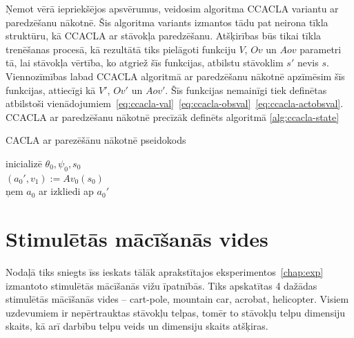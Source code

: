 \documentclass{ludis} %
\begin{document}
Ņemot vērā iepriekšējos apsvērumus, veidosim algoritma CCACLA variantu ar
paredzēšanu nākotnē. Šis algoritma variants izmantos tādu pat neirona tīkla
struktūru, kā CCACLA ar stāvokļa paredzēšanu. Atšķirības būs tikai tīkla
trenēšanas procesā, kā rezultātā tiks pielāgoti funkciju $V$, $Ov$ un $Aov$
parametri tā, lai stāvokļa vērtība, ko atgriež šīs funkcijas, atbilstu stāvoklim
$s'$ nevis $s$. Viennozīmības labad CCACLA algoritmā ar paredzēšanu nākotnē
apzīmēsim šīs funkcijas, attiecīgi kā $V'$, $Ov'$ un $Aov'$. Šīs funkcijas
nemainīgi tiek definētas atbilstoši
vienādojumiem~\eqref{eq:ccacla-val}~\eqref{eq:ccacla-obsval}~\eqref{eq:ccacla-actobsval}.
CCACLA ar paredzēšanu nākotnē precīzāk definēts algoritmā \ref{alg:ccacla-state}


\begin{spacing}{1}
\begin{algorithm}
\caption{CACLA ar parezēšānu nākotnē pseidokods}\label{alg:ccacla-future}
inicializē $\theta_0, \psi_0, s_0$ \\
$(a_0', v_1) := Av_0(s_0)$ \\
ņem $a_0$ ar izkliedi ap $a_0'$ \\
\end{algorithm}
\end{spacing}

\chapter{Stimulētās mācīšanās vides}
Nodaļā tiks sniegts īss ieskats tālāk aprakstītajos eksperimentos~\ref{chap:exp}
izmantoto stimulētās mācīšanās vižu īpatnībās. Tiks apskatītas 4 dažādas
stimulētās mācīšanās vides -- cart-pole, mountain car, acrobat, helicopter.
Visiem uzdevumiem ir nepērtrauktas stāvokļu telpas, tomēr to stāvokļu telpu
dimensiju skaits, kā arī darbību telpu veids un dimensiju skaits atšķiras.
\end{document}
